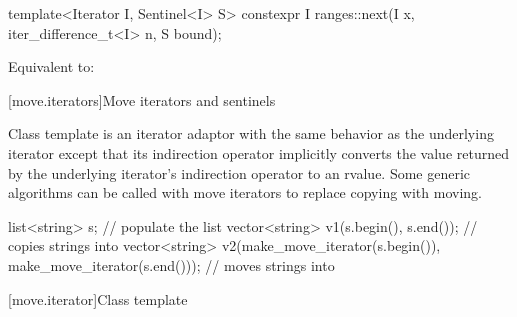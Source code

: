\documentclass{wg21}
\begin{document}
%
\begin{itemdecl}
	template<Iterator I, Sentinel<I> S>
	constexpr I ranges::next(I x, iter_difference_t<I> n, S bound);
\end{itemdecl}

\begin{itemdescr}
	\pnum
	\effects Equivalent to: 
\end{itemdescr}


[move.iterators]{Move iterators and sentinels}

\pnum
Class template  is an iterator adaptor
with the same behavior as the underlying iterator except that its
indirection operator implicitly converts the value returned by the
underlying iterator's indirection operator to an rvalue.
Some generic algorithms can be called with move iterators to replace
copying with moving.

\pnum
\begin{example}
	
	\begin{codeblock}
		list<string> s;
		// populate the list 
		vector<string> v1(s.begin(), s.end());          // copies strings into 
		vector<string> v2(make_move_iterator(s.begin()),
		make_move_iterator(s.end())); // moves strings into 
	\end{codeblock}
	
\end{example}

[move.iterator]{Class template }
\end{document}
